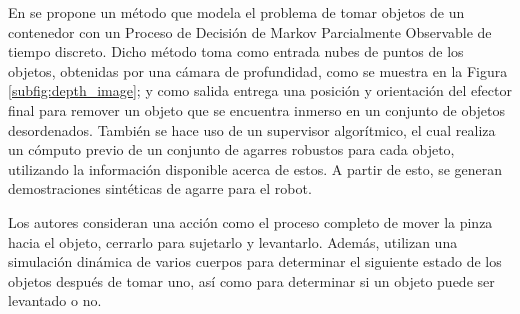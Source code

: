 %
En \cite{pmlr-v78-mahler17a} se propone un método que modela el problema de tomar objetos de un contenedor con un Proceso de Decisión de Markov Parcialmente Observable de tiempo discreto.
Dicho método toma como entrada nubes de puntos de los objetos, obtenidas por una cámara de profundidad, como se muestra en la Figura \ref{subfig:depth_image}; y como salida entrega una posición y orientación del efector final para remover un objeto que se encuentra inmerso en un conjunto de objetos desordenados.
También se hace uso de un supervisor algorítmico, el cual realiza un cómputo previo de un conjunto de agarres robustos para cada objeto, utilizando la información disponible acerca de estos.
A partir de esto, se generan demostraciones sintéticas de agarre para el robot.

Los autores consideran una acción como el proceso completo de mover la pinza hacia el objeto, cerrarlo para sujetarlo y levantarlo.
Además, utilizan una simulación dinámica de varios cuerpos para determinar el siguiente estado de los objetos después de tomar uno, así como para determinar si un objeto puede ser levantado o no.

